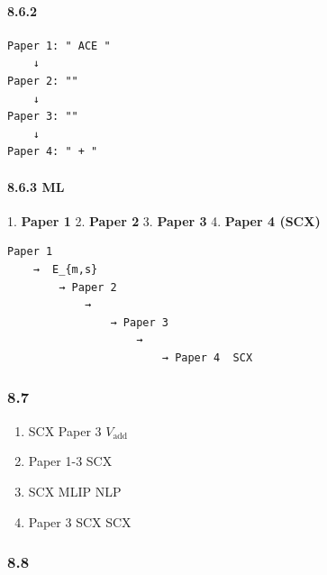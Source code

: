 \documentclass[
  12pt,
]{article}
\providecommand{\tightlist}{%
  \setlength{\itemsep}{0pt}\setlength{\parskip}{0pt}}
\begin{document}
\paragraph{8.6.2
}\label{ux8bbaux6587ux7684ux9012ux8fdbux5173ux7cfb}

\begin{verbatim}
Paper 1: " ACE "
    ↓ 
Paper 2: ""
    ↓ 
Paper 3: ""
    ↓ 
Paper 4: " + "
\end{verbatim}

\paragraph{8.6.3  ML
}\label{ux5728ux79d1ux5b66-ml-ux4e2dux7684ux7edfux4e00ux53d9ux4e8b}

\textbf{}

\textbf{} 1. \textbf{Paper
1} 2. \textbf{Paper
2} 3. \textbf{Paper
3} 4. \textbf{Paper 4
(SCX)}

\textbf{}

\begin{verbatim}
Paper 1 
    →  E_{m,s}
        → Paper 2 
            → 
                → Paper 3 
                    → 
                        → Paper 4  SCX 
\end{verbatim}

\subsubsection{8.7
}\label{ux5b9eux9645ux5e94ux7528ux4ef7ux503c}



\begin{enumerate}
\def\labelenumi{\arabic{enumi}.}
\tightlist
\item
  \textbf{}SCX  Paper 3 
  \(V_{\text{add}}\)
\item
  \textbf{}Paper 1-3  SCX 
\item
  \textbf{}SCX  MLIP
  NLP 
\item
  \textbf{}Paper 3  SCX SCX
  
\end{enumerate}

\subsubsection{8.8 }\label{ux8ba1ux7b97ux590dux6742ux5ea6-7}
\end{document}
